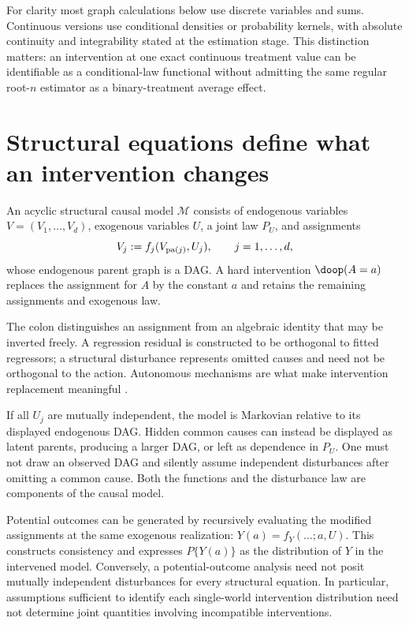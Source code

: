 For clarity most graph calculations below use discrete variables and sums.
Continuous versions use conditional densities or probability kernels, with
absolute continuity and integrability stated at the estimation stage. This
distinction matters: an intervention at one exact continuous treatment value
can be identifiable as a conditional-law functional without admitting the
same regular root-$n$ estimator as a binary-treatment average effect.

\section{Structural equations define what an intervention changes}
\begin{definition}
An acyclic structural causal model $\mathcal M$ consists of endogenous
variables $V=(V_1,\ldots,V_d)$, exogenous variables $U$, a joint law $P_U$,
and assignments
\[
 V_j:=f_j(V_{\operatorname{pa}(j)},U_j),\qquad j=1,\ldots,d,
\]
whose endogenous parent graph is a DAG. A hard intervention $\doop(A=a)$
replaces the assignment for $A$ by the constant $a$ and retains the remaining
assignments and exogenous law.
\end{definition}
The colon distinguishes an assignment from an algebraic identity that may
be inverted freely. A regression residual is constructed to be orthogonal
to fitted regressors; a structural disturbance represents omitted causes
and need not be orthogonal to the action. Autonomous mechanisms are what
make intervention replacement meaningful \citep[Sections 3.1--3.2]{pearl2009}.

If all $U_j$ are mutually independent, the model is Markovian relative to
its displayed endogenous DAG. Hidden common causes can instead be displayed
as latent parents, producing a larger DAG, or left as dependence in $P_U$.
One must not draw an observed DAG and silently assume independent disturbances
after omitting a common cause. Both the functions and the disturbance law
are components of the causal model.

Potential outcomes can be generated by recursively evaluating the modified
assignments at the same exogenous realization: $Y(a)=f_Y(\ldots;a,U)$.
This constructs consistency and expresses $P\{Y(a)\}$ as the distribution
of $Y$ in the intervened model. Conversely, a potential-outcome analysis
need not posit mutually independent disturbances for every structural
equation. In particular, assumptions sufficient to identify each
single-world intervention distribution need not determine joint quantities
involving incompatible interventions.


